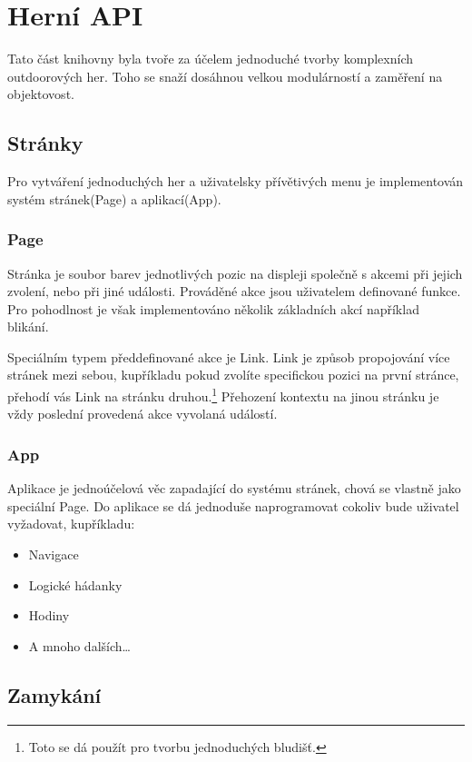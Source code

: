 \chapter{Herní API}
Tato část knihovny byla tvoře za účelem jednoduché tvorby komplexních outdoorových her.
Toho se snaží dosáhnou velkou modulárností a zaměření na objektovost.

\section{Stránky}

Pro vytváření jednoduchých her a uživatelsky přívětivých menu je implementován systém stránek(Page) a aplikací(App).

\subsection{Page}

Stránka je soubor barev jednotlivých pozic na displeji společně s akcemi při jejich zvolení, nebo při jiné události.
Prováděné akce jsou uživatelem definované funkce.
Pro pohodlnost je však implementováno několik základních akcí například blikání.

Speciálním typem předdefinované akce je Link.
Link je způsob propojování více stránek mezi sebou, kupříkladu pokud zvolíte specifickou pozici na první stránce, přehodí vás Link na stránku druhou.\footnote{Toto se dá použít pro tvorbu jednoduchých bludišť.}
Přehození kontextu na jinou stránku je vždy poslední provedená akce vyvolaná událostí.

\subsection{App}

Aplikace je jednoúčelová věc zapadající do systému stránek, chová se vlastně jako speciální Page.
Do aplikace se dá jednoduše naprogramovat cokoliv bude uživatel vyžadovat, kupříkladu:
\begin{itemize}
    \item Navigace
    \item Logické hádanky
    \item Hodiny
    \item A mnoho dalších\dots
\end{itemize}

\section{Zamykání}

